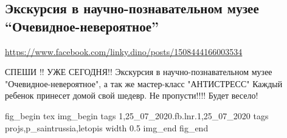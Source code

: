  
 

\subsection{Экскурсия в научно-познавательном музее ``Очевидное-невероятное''}
\label{sec:25_07_2020.fb.lnr.1}
\url{https://www.facebook.com/linky.dino/posts/1508444166003534}


СПЕШИ !! УЖЕ СЕГОДНЯ!! Экскурсия в научно-познавательном музее
"Очевидное-невероятное", а так же мастер-класс "АНТИСТРЕСС" Каждый ребенок
принесет домой свой шедевр. Не пропусти!!!! Будет весело!

\ifcmt
fig_begin 
  tex \centering
  img_begin 
    tags 1,25_07_2020.fb.lnr.1,25_07_2020
    tags projs,p_saintrussia,letopis
    width 0.5
  img_end
fig_end
\fi
